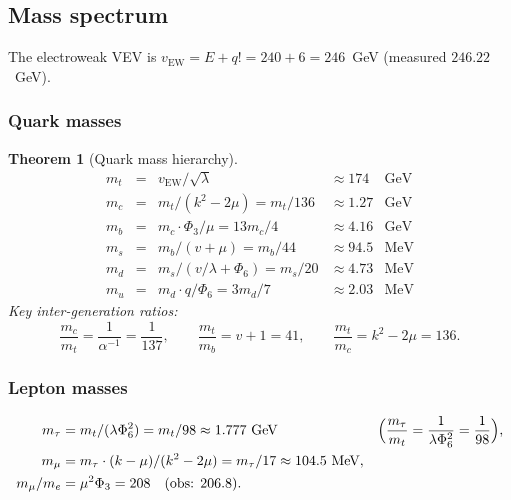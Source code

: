 \documentclass[12pt,a4paper]{article}
\newtheorem{theorem}{Theorem}[section]
\theoremstyle{definition}
\newcommand{\Phithree}{\Phi_3}
\newcommand{\Phisix}{\Phi_6}
\newcommand{\vEW}{v_{\mathrm{EW}}}
\begin{document}
\subsection{Mass spectrum}

The electroweak VEV is $\vEW = E+q! = 240+6 = 246$~GeV (measured $246.22$~GeV).

\subsubsection*{Quark masses}

\begin{theorem}[Quark mass hierarchy]
\label{thm:quarks}
\begin{equation}
  \renewcommand{\arraystretch}{1.6}
  \begin{array}{rclrl}
  m_t &=& \vEW/\sqrt{\lambda} &\approx 174 &\text{GeV} \\
  m_c &=& m_t/(k^2-2\mu) = m_t/136 &\approx 1.27 &\text{GeV} \\
  m_b &=& m_c\cdot\Phithree/\mu = 13m_c/4 &\approx 4.16 &\text{GeV} \\
  m_s &=& m_b/(v+\mu) = m_b/44 &\approx 94.5 &\text{MeV} \\
  m_d &=& m_s/(v/\lambda+\Phisix) = m_s/20 &\approx 4.73 &\text{MeV} \\
  m_u &=& m_d\cdot q/\Phisix = 3m_d/7 &\approx 2.03 &\text{MeV}
  \end{array}
\end{equation}
Key inter-generation ratios:
\begin{equation}
  \frac{m_c}{m_t} = \frac{1}{\alpha^{-1}} = \frac{1}{137},
  \qquad
  \frac{m_t}{m_b} = v+1 = 41,
  \qquad
  \frac{m_t}{m_c} = k^2-2\mu = 136.
\end{equation}
\end{theorem}

\subsubsection*{Lepton masses}

\begin{align}
  m_\tau &= m_t/(\lambda\Phisix^2) = m_t/98 \approx 1.777\text{ GeV}
    &&\Bigl(\frac{m_\tau}{m_t}=\frac{1}{\lambda\Phisix^2}=\frac{1}{98}\Bigr),\\
  m_\mu  &= m_\tau\cdot(k-\mu)/(k^2-2\mu) = m_\tau/17 \approx 104.5\text{ MeV},\\
  m_\mu/m_e &= \mu^2\Phithree = 208 \quad(\text{obs: }206.8).
\end{align}
\end{document}
